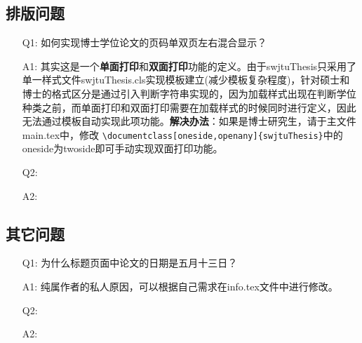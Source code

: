 \subsection{排版问题}
\begin{enumerate}
	\item[Q1:]如何实现博士学位论文的页码单双页左右混合显示？
	\item[A1:]其实这是一个\textbf{单面打印}和\textbf{双面打印}功能的定义。由于swjtuThesis只采用了单一样式文件swjtuThesis.cls实现模板建立(减少模板复杂程度)，针对硕士和博士的格式区分是通过引入判断字符串实现的，因为加载样式出现在判断学位种类之前，而单面打印和双面打印需要在加载样式的时候同时进行定义，因此无法通过模板自动实现此项功能。\textbf{解决办法}：如果是博士研究生，请于主文件main.tex中，修改\newline
\verb|\documentclass[oneside,openany]{swjtuThesis}|中的oneside为twoside即可手动实现双面打印功能。	
	\item[Q2:]
	\item[A2:]
\end{enumerate}

\subsection{其它问题}
\begin{enumerate}
	\item[Q1:]为什么标题页面中论文的日期是五月十三日？
	\item[A1:]纯属作者的私人原因，可以根据自己需求在info.tex文件中进行修改。
	\item[Q2:]
	\item[A2:]
\end{enumerate}
